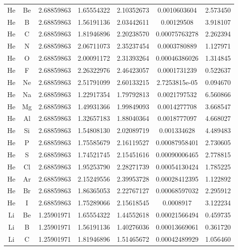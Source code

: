 \begin{longtable}{@{}ccccccc@{}}
He &  Be    &     2.68859863   &   1.65554322  &    2.10352673 &   0.0010603604  &  2.573450\\
He &  B     &     2.68859863   &   1.56191136  &    2.03442611 &     0.00129508  &  3.918107\\
He &  C     &     2.68859863   &   1.81946896  &    2.20238570 &  0.00075763278  &  2.262394\\
He &  N     &     2.68859863   &   2.06711073  &    2.35237454 &   0.0003780889  &  1.127971\\
He &  O     &     2.68859863   &   2.00091172  &    2.31393264 &  0.00046386026  &  1.314845\\
He &  F     &     2.68859863   &   2.26322976  &    2.46423057 &   0.0001731239  &  0.522637\\
He &  Ne    &     2.68859863   &   2.51791099  &    2.60133215 &  2.7253815e-05  &  0.094670\\
He &  Na    &     2.68859863   &   1.22917354  &    1.79792813 &   0.0021797532  &  6.560866\\
He &  Mg    &     2.68859863   &   1.49931366  &    1.99849093 &   0.0014277708  &  3.668547\\
He &  Al    &     2.68859863   &   1.32657183  &    1.88040364 &   0.0018777097  &  4.668027\\
He &  Si    &     2.68859863   &   1.54808130  &    2.02089719 &    0.001334628  &  4.489483\\
He &  P     &     2.68859863   &   1.75585679  &    2.16119527 &  0.00087958401  &  2.730605\\
He &  S     &     2.68859863   &   1.74521745  &    2.15451616 &  0.00090006465  &  2.778815\\
He &  Cl    &     2.68859863   &   1.95253790  &    2.28271739 &  0.00054130424  &  1.785225\\
He &  Ar    &     2.68859863   &   2.15249556  &    2.39953728 &  0.00028412395  &  1.122892\\
He &  Br    &     2.68859863   &   1.86365053  &    2.22767127 &  0.00068597032  &  2.295912\\
He &  I     &     2.68859863   &   1.75289066  &    2.15618545 &      0.0008917  &  3.122234\\
Li &  Be    &     1.25901971   &   1.65554322  &    1.44552618 &  0.00021566494  &  0.459735\\
Li &  B     &     1.25901971   &   1.56191136  &    1.40276036 &  0.00013669061  &  0.361720\\
Li &  C     &     1.25901971   &   1.81946896  &    1.51465672 &  0.00042489929  &  1.056460\\

\end{longtable}
